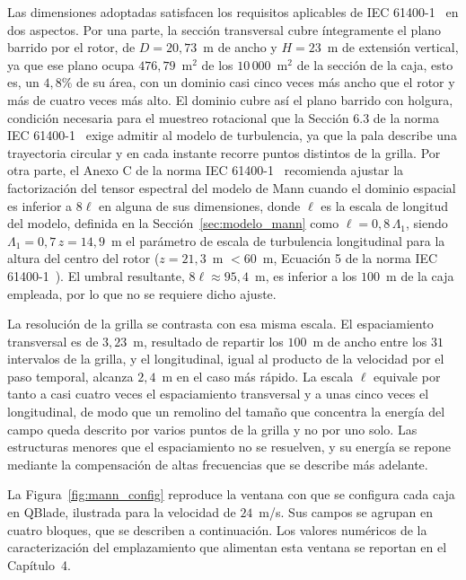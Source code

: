 Las dimensiones adoptadas satisfacen los requisitos aplicables de IEC 61400-1~\parencite*{IEC61400-1} en dos aspectos. Por una parte, la sección transversal cubre íntegramente el plano barrido por el rotor, de $D = 20{,}73$~m de ancho y $H = 23$~m de extensión vertical, ya que ese plano ocupa $476{,}79$~m$^2$ de los $10\,000$~m$^2$ de la sección de la caja, esto es, un $4{,}8\%$ de su área, con un dominio casi cinco veces más ancho que el rotor y más de cuatro veces más alto. El dominio cubre así el plano barrido con holgura, condición necesaria para el muestreo rotacional que la Sección 6.3 de la norma IEC 61400-1~\parencite*{IEC61400-1} exige admitir al modelo de turbulencia, ya que la pala describe una trayectoria circular y en cada instante recorre puntos distintos de la grilla. Por otra parte, el Anexo C de la norma IEC 61400-1~\parencite*{IEC61400-1} recomienda ajustar la factorización del tensor espectral del modelo de Mann cuando el dominio espacial es inferior a $8\ell$ en alguna de sus dimensiones, donde $\ell$ es la escala de longitud del modelo, definida en la Sección~\ref{sec:modelo_mann} como $\ell = 0{,}8\,\Lambda_1$, siendo $\Lambda_1 = 0{,}7\,z = 14{,}9$~m el parámetro de escala de turbulencia longitudinal para la altura del centro del rotor ($z = 21{,}3$~m $< 60$~m, Ecuación 5 de la norma IEC 61400-1~\parencite*{IEC61400-1}). El umbral resultante, $8\ell \approx 95{,}4$~m, es inferior a los $100$~m de la caja empleada, por lo que no se requiere dicho ajuste.

La resolución de la grilla se contrasta con esa misma escala. El espaciamiento transversal es de $3{,}23$~m, resultado de repartir los $100$~m de ancho entre los $31$ intervalos de la grilla, y el longitudinal, igual al producto de la velocidad por el paso temporal, alcanza $2{,}4$~m en el caso más rápido. La escala $\ell$ equivale por tanto a casi cuatro veces el espaciamiento transversal y a unas cinco veces el longitudinal, de modo que un remolino del tamaño que concentra la energía del campo queda descrito por varios puntos de la grilla y no por uno solo. Las estructuras menores que el espaciamiento no se resuelven, y su energía se repone mediante la compensación de altas frecuencias que se describe más adelante.

La Figura~\ref{fig:mann_config} reproduce la ventana con que se configura cada caja en QBlade, ilustrada para la velocidad de $24$~m/s. Sus campos se agrupan en cuatro bloques, que se describen a continuación. Los valores numéricos de la caracterización del emplazamiento que alimentan esta ventana se reportan en el Capítulo~4.

